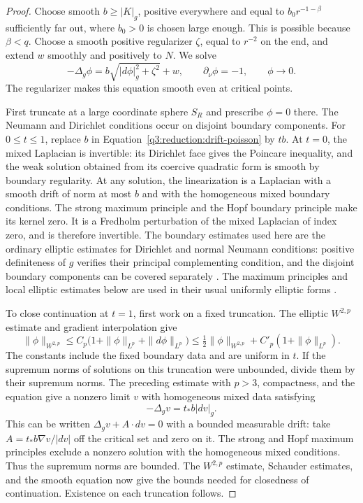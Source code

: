 \begin{proof}
Choose smooth $b\ge|K|_g$, positive everywhere and equal to
$b_0r^{-1-\beta}$ sufficiently far out, where $b_0>0$ is chosen large
enough.  This is possible because $\beta<q$.  Choose a smooth positive
regularizer $\zeta$, equal to $r^{-2}$ on the end, and extend $w$ smoothly
and positively to $N$.  We solve
\begin{equation}
 \label{q3:reduction:drift-poisson}
 -\Delta_g\phi=b\sqrt{|d\phi|_g^2+\zeta^2}+w,
 \qquad \partial_\nu\phi=-1,
 \qquad \phi\longrightarrow0.
\end{equation}
The regularizer makes this equation smooth even at critical points.

First truncate at a large coordinate sphere $S_R$ and prescribe
$\phi=0$ there.  The Neumann and Dirichlet conditions occur on disjoint
boundary components.  For $0\le t\le1$, replace $b$ in
Equation~\eqref{q3:reduction:drift-poisson} by $tb$.  At $t=0$, the mixed
Laplacian is invertible: its Dirichlet face gives the Poincare inequality,
and the weak solution obtained from its coercive quadratic form is smooth
by boundary regularity.  At any solution, the linearization is a
Laplacian with a smooth drift of norm at most $b$ and with the homogeneous
mixed boundary conditions.  The strong maximum principle and the Hopf
boundary principle make its kernel zero.  It is a Fredholm perturbation
of the mixed Laplacian of index zero, and is therefore invertible.
The boundary estimates used here are the ordinary elliptic estimates
for Dirichlet and normal Neumann conditions: positive definiteness of
$g$ verifies their principal complementing condition, and the disjoint
boundary components can be covered separately
\cite{AgmonDouglisNirenberg1959}.  The maximum principles and local
elliptic estimates below are used in their usual uniformly elliptic
forms \cite{GilbargTrudinger2001}.

To close continuation at $t=1$, first work on a fixed truncation.
The elliptic $W^{2,p}$ estimate
and gradient interpolation give
\[
 \|\phi\|_{W^{2,p}}
 \le C_p\bigl(1+\|\phi\|_{L^p}+\|d\phi\|_{L^p}\bigr)
 \le \tfrac12\|\phi\|_{W^{2,p}}
       +C'_p(1+\|\phi\|_{L^p}).
\]
The constants include the fixed boundary data and are uniform in $t$.
If the supremum norms of solutions on this truncation were unbounded,
divide them by their supremum norms.  The preceding estimate with
$p>3$, compactness, and the equation give a nonzero limit $v$ with
homogeneous mixed data satisfying
\[
 -\Delta_gv=t_*b|dv|_g.
\]
This can be written $\Delta_gv+A\cdot dv=0$ with a bounded measurable
drift: take $A=t_*b\nabla v/|dv|$ off the critical set and zero on it.
The strong and Hopf maximum principles exclude a nonzero solution with
the homogeneous mixed conditions.  Thus the supremum norms are bounded.
The $W^{2,p}$ estimate, Schauder estimates, and the smooth equation now
give the bounds needed for closedness of continuation.  Existence on
each truncation follows.


\end{proof}
